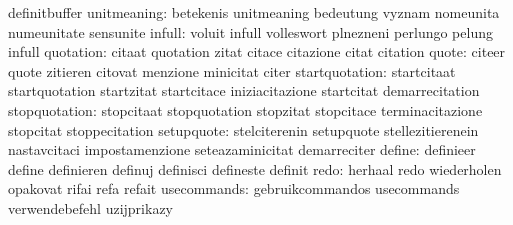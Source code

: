                                   definitbuffer
                     unitmeaning: betekenis                        unitmeaning
                                  bedeutung                        vyznam
                                  nomeunita                        numeunitate
                                  sensunite
                          infull: voluit                           infull
                                  volleswort                       plnezneni
                                  perlungo                         pelung
                                  infull
                       quotation: citaat                           quotation
                                  zitat                            citace
                                  citazione                        citat
                                  citation
                           quote: citeer                           quote
                                  zitieren                         citovat
                                  menzione                         minicitat
                                  citer
                  startquotation: startcitaat                      startquotation
                                  startzitat                       startcitace
                                  iniziacitazione                  startcitat
                                  demarrecitation
                   stopquotation: stopcitaat                       stopquotation
                                  stopzitat                        stopcitace
                                  terminacitazione                 stopcitat
                                  stoppecitation
                      setupquote: stelciterenin                    setupquote
                                  stellezitierenein                nastavcitaci
                                  impostamenzione                  seteazaminicitat
                                  demarreciter
                          define: definieer                        define
                                  definieren                       definuj
                                  definisci                        defineste
                                  definit
                            redo: herhaal                          redo
                                  wiederholen                      opakovat
                                  rifai                            refa
                                  refait
                     usecommands: gebruikcommandos                 usecommands
                                  verwendebefehl                   uzijprikazy
